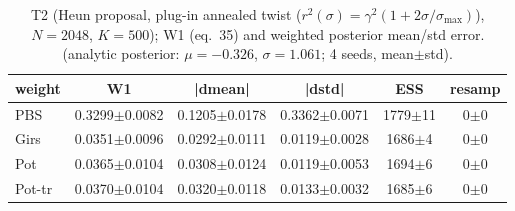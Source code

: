 \begin{table}[ht]
\centering
\caption{T2 (Heun proposal, plug-in annealed twist ($r^2(\sigma)=\gamma^2(1+2\sigma/\sigma_{\max})$), $N=2048$, $K=500$); W1 (eq.~35) and weighted posterior mean/std error. (analytic posterior: $\mu=-0.326$, $\sigma=1.061$; 4 seeds, mean$\pm$std).}
\label{tab:toy_t2_heun}
\begin{tabular}{lccccc}
\toprule
weight & W1 & |dmean| & |dstd| & ESS & resamp \\
\midrule
PBS & 0.3299$\pm$0.0082 & 0.1205$\pm$0.0178 & 0.3362$\pm$0.0071 & 1779$\pm$11 & 0$\pm$0 \\
Girs & 0.0351$\pm$0.0096 & 0.0292$\pm$0.0111 & 0.0119$\pm$0.0028 & 1686$\pm$4 & 0$\pm$0 \\
Pot & 0.0365$\pm$0.0104 & 0.0308$\pm$0.0124 & 0.0119$\pm$0.0053 & 1694$\pm$6 & 0$\pm$0 \\
Pot-tr & 0.0370$\pm$0.0104 & 0.0320$\pm$0.0118 & 0.0133$\pm$0.0032 & 1685$\pm$6 & 0$\pm$0 \\
\bottomrule
\end{tabular}
\end{table}
